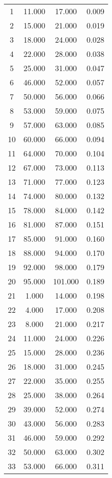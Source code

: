 % 
\begin{tabular}{cccc}
  \hline
  \hline
1 & 11.000 & 17.000 & 0.009 \\ 
  2 & 15.000 & 21.000 & 0.019 \\ 
  3 & 18.000 & 24.000 & 0.028 \\ 
  4 & 22.000 & 28.000 & 0.038 \\ 
  5 & 25.000 & 31.000 & 0.047 \\ 
  6 & 46.000 & 52.000 & 0.057 \\ 
  7 & 50.000 & 56.000 & 0.066 \\ 
  8 & 53.000 & 59.000 & 0.075 \\ 
  9 & 57.000 & 63.000 & 0.085 \\ 
  10 & 60.000 & 66.000 & 0.094 \\ 
  11 & 64.000 & 70.000 & 0.104 \\ 
  12 & 67.000 & 73.000 & 0.113 \\ 
  13 & 71.000 & 77.000 & 0.123 \\ 
  14 & 74.000 & 80.000 & 0.132 \\ 
  15 & 78.000 & 84.000 & 0.142 \\ 
  16 & 81.000 & 87.000 & 0.151 \\ 
  17 & 85.000 & 91.000 & 0.160 \\ 
  18 & 88.000 & 94.000 & 0.170 \\ 
  19 & 92.000 & 98.000 & 0.179 \\ 
  20 & 95.000 & 101.000 & 0.189 \\ 
  21 & 1.000 & 14.000 & 0.198 \\ 
  22 & 4.000 & 17.000 & 0.208 \\ 
  23 & 8.000 & 21.000 & 0.217 \\ 
  24 & 11.000 & 24.000 & 0.226 \\ 
  25 & 15.000 & 28.000 & 0.236 \\ 
  26 & 18.000 & 31.000 & 0.245 \\ 
  27 & 22.000 & 35.000 & 0.255 \\ 
  28 & 25.000 & 38.000 & 0.264 \\ 
  29 & 39.000 & 52.000 & 0.274 \\ 
  30 & 43.000 & 56.000 & 0.283 \\ 
  31 & 46.000 & 59.000 & 0.292 \\ 
  32 & 50.000 & 63.000 & 0.302 \\ 
  33 & 53.000 & 66.000 & 0.311 \\ 

\end{tabular}
